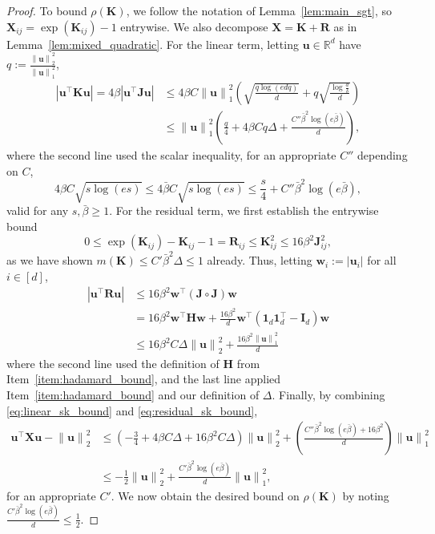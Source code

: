 \documentclass[11pt]{article}
\newcommand{\defeq}{:=}
\newcommand{\norm}[1]{\left\lVert#1\right\rVert}
\newcommand{\R}{\mathbb{R}}
\newcommand{\half}{\frac{1}{2}}
\newcommand{\1}{\mathbf{1}}
\newcommand{\0}{\mathbf{0}}
\newcommand{\id}{\mathbf{I}}
\newcommand{\Par}[1]{\left(#1\right)}
\newcommand{\Abs}[1]{\left|#1\right|}
\newcommand{\mh}{{\mathbf{H}}}
\newcommand{\mj}{{\mathbf{J}}}
\newcommand{\mk}{{\mathbf{K}}}
\newcommand{\mr}{{\mathbf{R}}}
\newcommand{\mx}{{\mathbf{X}}}
\newcommand{\vu}{{\mathbf{u}}}
\newcommand{\vw}{{\mathbf{w}}}
\begin{document}
\begin{proof}
To bound $\rho(\mk)$, we follow the notation of Lemma~\ref{lem:main_sgt}, so $\mx_{ij} = \exp(\mk_{ij}) - 1$ entrywise. We also decompose $\mx = \mk + \mr$ as in Lemma~\ref{lem:mixed_quadratic}. For the linear term,
letting $\vu \in \R^d$ have $q \defeq \frac{\norm{\vu}_2^2}{\norm{\vu}_1^2}$,
\begin{equation}\label{eq:linear_sk_bound}
\begin{aligned}\Abs{\vu^\top \mk \vu} = 4\beta\Abs{\vu^\top \mj \vu} &\le 4\beta C\norm{\vu}_1^2\Par{\sqrt{\frac{q\log(edq)}{d}} + q\sqrt{\frac{\log \frac d\delta}{d}}} \\
&\le \norm{\vu}_1^2\Par{\frac q 4 + 4\beta Cq\Delta +  \frac{C''\bar{\beta}^2 \log(e\bar{\beta})}{d}},
\end{aligned}
\end{equation}
where the second line used the scalar inequality, for an appropriate $C''$ depending on $C$,
\[4\beta C \sqrt{s\log(es)} \le 4\bar{\beta}C\sqrt{s \log (es)} \le \frac s 4 + C''\bar{\beta}^2\log(e\bar{\beta}),\]
valid for any $s, \bar{\beta} \ge 1$.
For the residual term, we first establish the entrywise bound
\[0 \le \exp(\mk_{ij}) - \mk_{ij} - 1 = \mr_{ij} \le \mk_{ij}^2 \le 16\beta^2 \mj_{ij}^2,\]
as we have shown $m(\mk) \le C'\bar{\beta}^2 \Delta \le 1$ already. Thus, letting $\vw_i \defeq |\vu_i|$ for all $i \in [d]$,
\begin{equation}\label{eq:residual_sk_bound}
\begin{aligned}\Abs{\vu^\top \mr \vu} &\le 16\beta^2 \vw^\top \Par{\mj \circ \mj} \vw \\
&= 16\beta^2 \vw^\top \mh \vw + \frac {16\beta^2} d \vw^\top\Par{\1_d \1_d^\top - \id_d}\vw \\
&\le 16\beta^2C\Delta\norm{\vu}_2^2+ \frac{16\beta^2\norm{\vu}_1^2}{d} \end{aligned}
\end{equation}
where the second line used the definition of $\mh$ from Item~\ref{item:hadamard_bound}, and the last line applied Item~\ref{item:hadamard_bound} and our definition of $\Delta$. Finally, by combining \eqref{eq:linear_sk_bound} and \eqref{eq:residual_sk_bound},
\begin{align*}\vu^\top \mx \vu - \norm{\vu}_2^2 &\le \Par{-\frac 3 4 + 4\beta C \Delta+ 16\beta^2 C \Delta }\norm{\vu}_2^2+ \Par{\frac{C''\bar{\beta}^2 \log(e\bar{\beta}) + 16\beta^2}{d}}\norm{\vu}_1^2 \\
&\le -\half \norm{\vu}_2^2 + \frac{C' \bar{\beta}^2\log(e\bar{\beta})}{d}\norm{\vu}_1^2,
\end{align*}
for an appropriate $C'$. We now obtain the desired bound on $\rho(\mk)$ by noting $\frac{C' \bar{\beta}^2\log(e\bar{\beta})}{d} \le \half$.
\end{proof}
\end{document}
